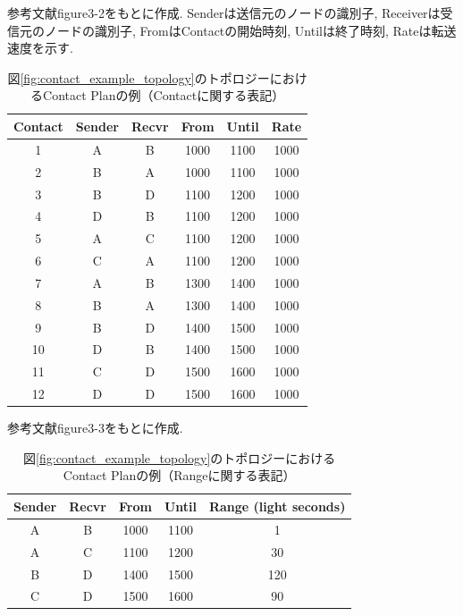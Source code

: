 \begin{table}[htbp]
    \centering
    \caption{図\ref{fig:contact_example_topology}のトポロジーにおけるContact Planの例（Contactに関する表記）}
    \label{table:contact_example_contactplan}
    \begin{minipage}{\textwidth}
        \raggedright
        \vspace{2mm}
        \fontsize{10.5pt}{12pt}\selectfont
        参考文献\cite{schedule_aware_bundle_routing}figure3-2をもとに作成. 
        Senderは送信元のノードの識別子, Receiverは受信元のノードの識別子, FromはContactの開始時刻, Untilは終了時刻, Rateは転送速度を示す.  
        \vspace{2mm}
    \end{minipage}
    \begin{tabular}{cccccc}
      \hline
      Contact & Sender & Recvr & From & Until & Rate \\
      \hline
      1 & A & B & 1000 & 1100 & 1000 \\
      2 & B & A & 1000 & 1100 & 1000 \\
      3 & B & D & 1100 & 1200 & 1000 \\
      4 & D & B & 1100 & 1200 & 1000 \\
      5 & A & C & 1100 & 1200 & 1000 \\
      6 & C & A & 1100 & 1200 & 1000 \\
      7 & A & B & 1300 & 1400 & 1000 \\
      8 & B & A & 1300 & 1400 & 1000 \\
      9 & B & D & 1400 & 1500 & 1000 \\
      10 & D & B & 1400 & 1500 & 1000 \\
      11 & C & D & 1500 & 1600 & 1000 \\
      12 & D & D & 1500 & 1600 & 1000 \\
      \hline
    \end{tabular}
\end{table}
\begin{table}[htbp]
    \centering
    \caption{図\ref{fig:contact_example_topology}のトポロジーにおけるContact Planの例（Rangeに関する表記）}
    \label{table:contact_example_contactrange}
    \begin{minipage}{\textwidth}
        \centering
        \vspace{2mm}
        \fontsize{10.5pt}{12pt}\selectfont
        参考文献\cite{schedule_aware_bundle_routing}figure3-3をもとに作成.  
        \vspace{2mm}
    \end{minipage}
    \begin{tabular}{ccccc}
        \hline
        Sender & Recvr & From & Until & Range (light seconds) \\
        \hline
        A & B & 1000 & 1100 & 1 \\
        A & C & 1100 & 1200 & 30 \\
        B & D & 1400 & 1500 & 120 \\
        C & D & 1500 & 1600 & 90 \\
        \hline
    \end{tabular}
  \end{table}

